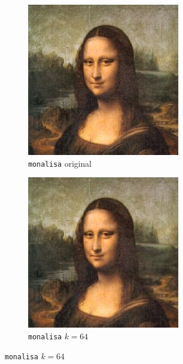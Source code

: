 \documentclass[brazilian,a4paper,twocolumn]{article}
\begin{document}
        \begin{figure}[H]
            \centering
            \begin{subfigure}{0.23\textwidth}
                \includegraphics[width=\textwidth,keepaspectratio]{monalisa}
                \caption{\texttt{monalisa} original}
                \label{fig:monalisa-original}
            \end{subfigure}
            \begin{subfigure}{0.23\textwidth}
                \includegraphics[width=\textwidth,keepaspectratio]{monalisa-64}
                \caption{\texttt{monalisa} $k=64$}
                \label{fig:monalisa-64}
            \end{subfigure}


\end{figure}
\end{document}

